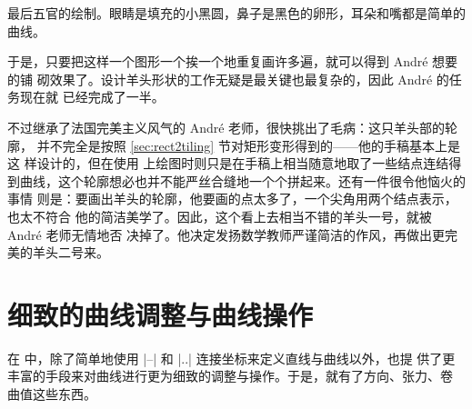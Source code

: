最后五官的绘制。眼睛是填充的小黑圆，鼻子是黑色的卵形，耳朵和嘴都是简单的曲线。

于是，只要把这样一个图形一个挨一个地重复画许多遍，就可以得到 André 想要的铺
砌效果了。设计羊头形状的工作无疑是最关键也最复杂的，因此 André 的任务现在就
已经完成了一半。

不过继承了法国完美主义风气的 André 老师，很快挑出了毛病：这只羊头部的轮廓，
并不完全是按照 \ref{sec:rect2tiling} 节对矩形变形得到的——他的手稿基本上是这
样设计的，但在使用 \Asy{} 上绘图时则只是在手稿上相当随意地取了一些结点连结得
到曲线，这个轮廓想必也并不能严丝合缝地一个个拼起来。还有一件很令他恼火的事情
则是：要画出羊头的轮廓，他要画的点太多了，一个尖角用两个结点表示，也太不符合
他的简洁美学了。因此，这个看上去相当不错的羊头一号，就被 André 老师无情地否
决掉了。他决定发扬数学教师严谨简洁的作风，再做出更完美的羊头二号来。

\section{细致的曲线调整与曲线操作}

在 \Asy{} 中，除了简单地使用 |--| 和 |..| 连接坐标来定义直线与曲线以外，也提
供了更丰富的手段来对曲线进行更为细致的调整与操作。于是，就有了方向、张力、卷
曲值这些东西。

